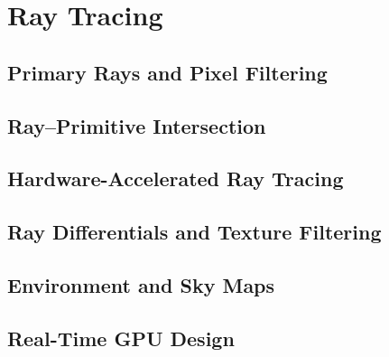 \chapter{Ray Tracing}\label{ch:ray-tracing}

\section{Primary Rays and Pixel Filtering}\label{sec:primary-rays-and-pixel-filtering}

\section{Ray--Primitive Intersection}\label{sec:ray-intersection}



\section{Hardware-Accelerated Ray Tracing}\label{sec:hardware-accelerated-ray-tracing}

\section{Ray Differentials and Texture Filtering}\label{sec:ray-differentials-and-texture-filtering}

\section{Environment and Sky Maps\optmark}\label{sec:environment-and-sky-maps}

\section{Real-Time GPU Design}\label{sec:real-time-gpu-design}
